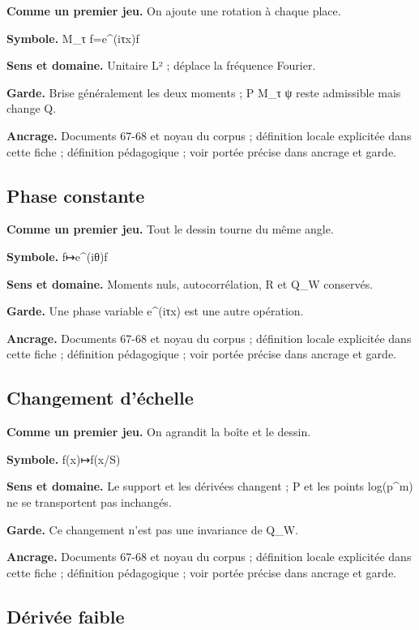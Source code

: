 \documentclass[
  9pt,
  a4paper,
]{article}
\begin{document}
\textbf{Comme un premier jeu.} On ajoute une rotation à chaque place.

\textbf{Symbole.} M\_τ f=e\^{}(iτx)f

\textbf{Sens et domaine.} Unitaire L² ; déplace la fréquence Fourier.

\textbf{Garde.} Brise généralement les deux moments ; P M\_τ ψ reste
admissible mais change Q.

\textbf{Ancrage.} Documents 67-68 et noyau du corpus ; définition locale
explicitée dans cette fiche ; définition pédagogique ; voir portée
précise dans ancrage et garde.

\hypertarget{phase-constante}{%
\subsection{Phase constante}\label{phase-constante}}

\textbf{Comme un premier jeu.} Tout le dessin tourne du même angle.

\textbf{Symbole.} f↦e\^{}(iθ)f

\textbf{Sens et domaine.} Moments nuls, autocorrélation, R et Q\_W
conservés.

\textbf{Garde.} Une phase variable e\^{}(iτx) est une autre opération.

\textbf{Ancrage.} Documents 67-68 et noyau du corpus ; définition locale
explicitée dans cette fiche ; définition pédagogique ; voir portée
précise dans ancrage et garde.

\hypertarget{changement-duxe9chelle}{%
\subsection{Changement d'échelle}\label{changement-duxe9chelle}}

\textbf{Comme un premier jeu.} On agrandit la boîte et le dessin.

\textbf{Symbole.} f(x)↦f(x/S)

\textbf{Sens et domaine.} Le support et les dérivées changent ; P et les
points log(p\^{}m) ne se transportent pas inchangés.

\textbf{Garde.} Ce changement n'est pas une invariance de Q\_W.

\textbf{Ancrage.} Documents 67-68 et noyau du corpus ; définition locale
explicitée dans cette fiche ; définition pédagogique ; voir portée
précise dans ancrage et garde.

\hypertarget{duxe9rivuxe9e-faible}{%
\subsection{Dérivée faible}\label{duxe9rivuxe9e-faible}}
\end{document}
